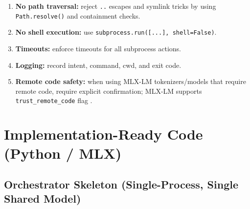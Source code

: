 \documentclass[11pt]{article}
\begin{document}
\begin{enumerate}
  \item \textbf{No path traversal:} reject \texttt{..} escapes and symlink tricks by using \texttt{Path.resolve()} and containment checks.
  \item \textbf{No shell execution:} use \texttt{subprocess.run([...], shell=False)}.
  \item \textbf{Timeouts:} enforce timeouts for all subprocess actions.
  \item \textbf{Logging:} record intent, command, cwd, and exit code.
  \item \textbf{Remote code safety:} when using MLX-LM tokenizers/models that require remote code, require explicit confirmation; MLX-LM supports \texttt{trust\_remote\_code} flag \cite{MLXLM_Readme}.
\end{enumerate}

\section{Implementation-Ready Code (Python / MLX)}

\subsection{Orchestrator Skeleton (Single-Process, Single Shared Model)}
\end{document}
